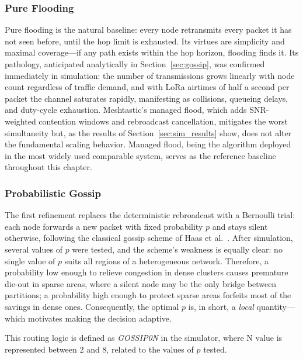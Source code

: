 \documentclass[english,bachelor]{tfgitic}[2026/01/22]
\begin{document}
\subsubsection{Pure Flooding}
Pure flooding is the natural baseline: every node retransmits every packet it has not seen before, until the hop limit is exhausted. Its virtues are simplicity and maximal coverage---if any path exists within the hop horizon, flooding finds it. Its pathology, anticipated analytically in Section~\ref{sec:gossip}, was confirmed immediately in simulation: the number of transmissions grows linearly with node count regardless of traffic demand, and with LoRa airtimes of half a second per packet the channel saturates rapidly, manifesting as collisions, queueing delays, and duty-cycle exhaustion. Meshtastic's managed flood, which adds SNR-weighted contention windows and rebroadcast cancellation, mitigates the worst simultaneity but, as the results of Section~\ref{sec:sim_results} show, does not alter the fundamental scaling behavior. Managed flood, being the algorithm deployed in the most widely used comparable system, serves as the reference baseline throughout this chapter.

\subsubsection{Probabilistic Gossip}
The first refinement replaces the deterministic rebroadcast with a Bernoulli trial: each node forwards a new packet with fixed probability $p$ and stays silent otherwise, following the classical gossip scheme of Haas et al.~\cite{haas2006gossip}. After simulation, several values of $p$ were tested, and the scheme's weakness is equally clear: no single value of $p$ suits all regions of a heterogeneous network. Therefore, a probability low enough to relieve congestion in dense clusters causes premature die-out in sparse areas, where a silent node may be the only bridge between partitions; a probability high enough to protect sparse areas forfeits most of the savings in dense ones. Consequently, the optimal $p$ is, in short, a \emph{local} quantity---which motivates making the decision adaptive.

This routing logic is defined as \emph{GOSSIP0N} in the simulator, where N value is represented between 2 and 8, related to the values of $p$ tested.
\end{document}
